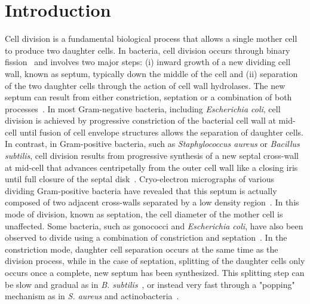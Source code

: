 \section{Introduction}

Cell division is a fundamental biological process that allows a single mother cell to produce two daughter cells.
In bacteria, cell division occurs through binary fission~\cite{harryBacterialCellDivision2006} and involves two major steps: (i) inward growth of a new dividing cell wall, known as septum, typically down the middle of the cell and (ii) separation of the two daughter cells through the action of cell wall hydrolases.
The new septum can result from either constriction, septation or a combination of both processes~\cite{ericksonHowBacterialCell2017,navarroCellWallSynthesis2022}.
In most Gram-negative bacteria, including \textit{Escherichia coli}, cell division is achieved by progressive constriction of the bacterial cell wall at mid-cell until fusion of cell envelope structures allows the separation of daughter cells.
In contrast, in Gram-positive bacteria, such as \textit{Staphylococcus aureus} or \textit{Bacillus subtilis}, cell division results from progressive synthesis of a new septal cross-wall at mid-cell that advances centripetally from the outer cell wall like a closing iris until full closure of the septal disk~\cite{beveridgeUltrastructureGramPositiveCell2006,giesbrechtStaphylococcalCellWall1998}.
Cryo-electron micrographs of various dividing Gram-positive bacteria have revealed that this septum is actually composed of two adjacent cross-walls separated by a low density region~\cite{matiasNativeCellWall2006,matiasCryoelectronMicroscopyCell2007,zuberGranularLayerPeriplasmic2006,sextonSuperresolutionConfocalCryoCLEM2022,murrayCellDivisionDeinococcus1983}.
In this mode of division, known as septation, the cell diameter of the mother cell is unaffected.
Some bacteria, such as gonococci and \textit{Escherichia coli}, have also been observed to divide using a combination of constriction and septation~\cite{navarroCellWallSynthesis2022,westling-haggstromGrowthPatternCell1977}.
In the constriction mode, daughter cell separation occurs at the same time as the division process, while in the case of septation, splitting of the daughter cells only occurs once a complete, new septum has been synthesized.
This splitting step can be slow and gradual as in \textit{B. subtilis}~\cite{smithAutolysinsBacillusSubtilis2000}, or instead very fast through a "popping" mechanism as in \textit{S. aureus} and actinobacteria~\cite{monteiroCellShapeDynamics2015,zhouMechanicalCrackPropagation2015,zhouFastMechanicallyDriven2016}.

